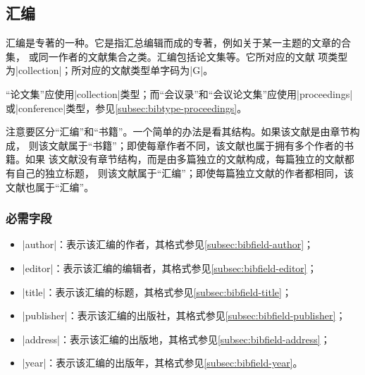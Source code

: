 
\subsection{汇编}\label{subsec:bibtype-collection}

汇编是专著的一种。它是指汇总编辑而成的专著\cite{zdic2013huibian}，例如关于某一主题的文章的合集，
或同一作者的文献集合之类。汇编包括论文集等\cite{gbt3469-1983}。它所对应的{\BibTeX}文献
项类型为|collection|；所对应的文献类型单字码为|G|\cite{gbt3469-1983}。

\begin{note}
“论文集”应使用|collection|类型；而“会议录”和“会议论文集”应使用|proceedings|
或|conference|类型，参见\ref{subsec:bibtype-proceedings}。
\end{note}

\begin{note}
注意要区分“汇编”和“书籍”。一个简单的办法是看其结构。如果该文献是由章节构成，
则该文献属于“书籍”；即使每章作者不同，该文献也属于拥有多个作者的书籍。如果
该文献没有章节结构，而是由多篇独立的文献构成，每篇独立的文献都有自己的独立标题，
则该文献属于“汇编”；即使每篇独立文献的作者都相同，该文献也属于“汇编”。
\end{note}

\subsubsection{必需字段}

\begin{itemize}
\item |author|：表示该汇编的作者，其格式参见\ref{subsec:bibfield-author}；
\item |editor|：表示该汇编的编辑者，其格式参见\ref{subsec:bibfield-editor}；
\item |title|：表示该汇编的标题，其格式参见\ref{subsec:bibfield-title}；
\item |publisher|：表示该汇编的出版社，其格式参见\ref{subsec:bibfield-publisher}；
\item |address|：表示该汇编的出版地，其格式参见\ref{subsec:bibfield-address}；
\item |year|：表示该汇编的出版年，其格式参见\ref{subsec:bibfield-year}。
\end{itemize}

